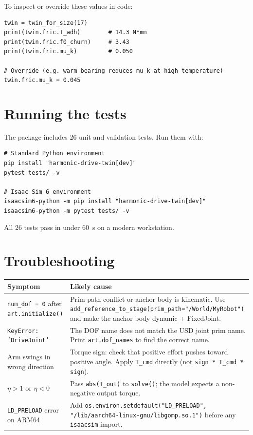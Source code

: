 \documentclass[11pt,a4paper]{article}
\begin{document}
\bigskip
To inspect or override these values in code:

\begin{lstlisting}
twin = twin_for_size(17)
print(twin.fric.T_adh)        # 14.3 N*mm
print(twin.fric.f0_churn)     # 3.43
print(twin.fric.mu_k)         # 0.050

# Override (e.g. warm bearing reduces mu_k at high temperature)
twin.fric.mu_k = 0.045
\end{lstlisting}

\section{Running the tests}

The package includes 26 unit and validation tests.  Run them with:

\begin{lstlisting}
# Standard Python environment
pip install "harmonic-drive-twin[dev]"
pytest tests/ -v

# Isaac Sim 6 environment
isaacsim6-python -m pip install "harmonic-drive-twin[dev]"
isaacsim6-python -m pytest tests/ -v
\end{lstlisting}

All 26 tests pass in under \SI{60}{s} on a modern workstation.

\section{Troubleshooting}

\begin{center}
\begin{tabular}{lp{8cm}}
\toprule
Symptom & Likely cause \\
\midrule
\texttt{num\_dof = 0} after \texttt{art.initialize()} &
  Prim path conflict or anchor body is kinematic.
  Use \texttt{add\_reference\_to\_stage(prim\_path="/World/MyRobot")}
  and make the anchor body dynamic + FixedJoint. \\[4pt]
\texttt{KeyError: 'DriveJoint'} &
  The DOF name does not match the USD joint prim name.
  Print \texttt{art.dof\_names} to find the correct name. \\[4pt]
Arm swings in wrong direction &
  Torque sign: check that positive effort pushes toward positive angle.
  Apply \texttt{T\_cmd} directly (not \texttt{sign * T\_cmd * sign}). \\[4pt]
\(\eta > 1\) or \(\eta < 0\) &
  Pass \texttt{abs(T\_out)} to \texttt{solve()};
  the model expects a non-negative output torque. \\[4pt]
\texttt{LD\_PRELOAD} error on ARM64 &
  Add \texttt{os.environ.setdefault("LD\_PRELOAD",}
  \texttt{"/lib/aarch64-linux-gnu/libgomp.so.1")}
  before any \texttt{isaacsim} import. \\
\bottomrule
\end{tabular}
\end{center}
\end{document}

